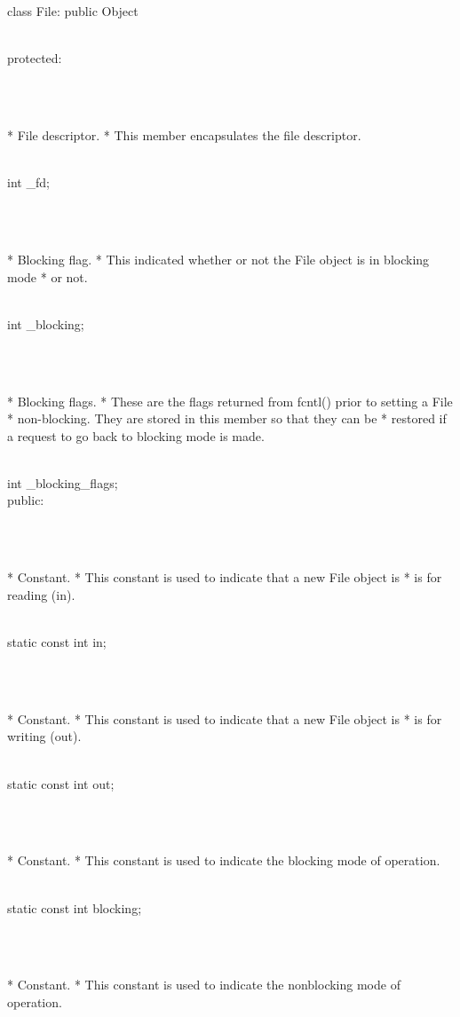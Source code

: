 \documentclass{article}
\begin{document}
 class File: public Object {
\\
 protected:
\strut\\\strut\\* File descriptor.
	  * This member encapsulates the file descriptor.
	  \strut\goodbreak
{}\strut\nopagebreak\\
     int _fd;
\strut\\\strut\\* Blocking flag.
	  * This indicated whether or not the File object is in blocking mode
	  * or not.
	  \strut\goodbreak
{}\strut\nopagebreak\\
         int _blocking;
\strut\\\strut\\* Blocking flags.
	  * These are the flags returned from fcntl() prior to setting a File
	  * non-blocking. They are stored in this member so that they can be 
	  * restored if a request to go back to blocking mode is made.
	  \strut\goodbreak
{}\strut\nopagebreak\\
         int _blocking_flags;
\\
 public:
\strut\\\strut\\* Constant.
	  * This constant is used to indicate that a new File object is
	  * is for reading (in).
	  \strut\goodbreak
{}\strut\nopagebreak\\
         static const int in;
\strut\\\strut\\* Constant.
	  * This constant is used to indicate that a new File object is
	  * is for writing (out).
	  \strut\goodbreak
{}\strut\nopagebreak\\
         static const int out;
\strut\\\strut\\* Constant.
	  * This constant is used to indicate the blocking mode of operation.
	  \strut\goodbreak
{}\strut\nopagebreak\\
         static const int blocking;
\strut\\\strut\\* Constant.
	  * This constant is used to indicate the nonblocking mode of operation.
	  \strut\goodbreak
{}\strut\nopagebreak\\
}
\end{document}

